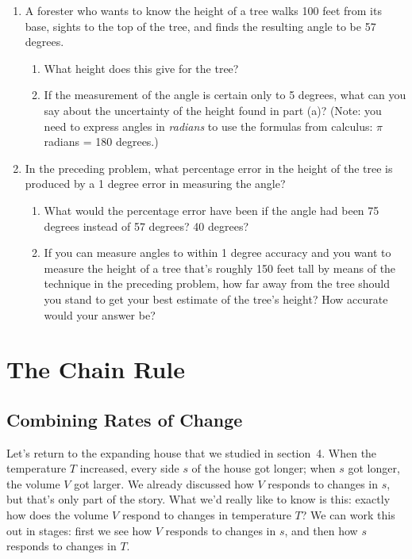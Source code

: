 \begin{enumerate}
\begin{enumerate}
\end{enumerate}
\item A forester who wants to know the height of a tree walks 100 feet
from its base, sights to the top of the tree, and finds the resulting
angle to be 57 degrees.

  \begin{enumerate}
  \item What height does this give for the tree?

  \item If the measurement of the angle is certain only to 5 degrees,
what can you say about the uncertainty of the
height found in part (a)?  (Note: you need to express angles in {\em
  radians\/} to use the formulas from calculus: $\pi$ radians = 180
degrees.)



\end{enumerate}
\item In the preceding problem, what percentage error in the height of
the tree is produced by a 1 degree error in measuring the angle?

  \begin{enumerate}
  \item What would the percentage error have been if the angle had been
75 degrees instead of 57 degrees?  40 degrees?

  \item If you can measure angles to within 1 degree accuracy and you
want to measure the height of a tree that's roughly 150 feet tall by
means of the technique in the preceding problem, how far away from the
tree should you stand to get your best estimate of the tree's height?
How accurate would your answer be?



\end{enumerate}
\end{enumerate}
\section{The Chain Rule}
\label{sec:the-chain-rule}

\subsection{Combining Rates of Change}
\label{subsec:combining-rates-of-change}

Let's return to the expanding house that we
studied in section~4.  When the temperature $T$ increased, every side $s$
of the house got longer; when $s$ got longer, the volume $V$ got
larger.  We already discussed how $V$ responds to changes in $s$, but
that's only part of the story.  What we'd really like to know is this:
exactly how does the volume $V$ respond to changes in temperature $T$?
We can work this out in stages: first we see how $V$ responds to
changes in $s$, and then how $s$ responds to changes in $T$.


